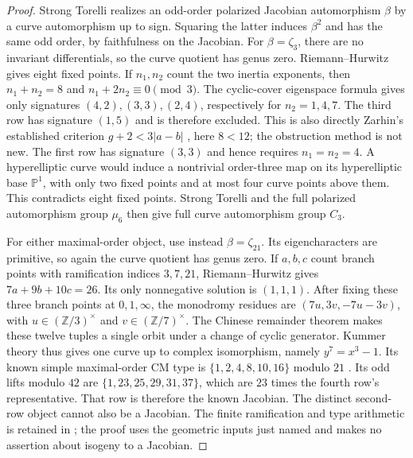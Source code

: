 \begin{proof}
Strong Torelli \cite[Theorem~12.1]{MilneJacobians2021} realizes an
odd-order polarized Jacobian automorphism $\beta$ by a curve
automorphism up to sign. Squaring the latter induces $\beta^2$
and has the same odd order, by faithfulness on the Jacobian.
For $\beta=\zeta_3$, there are no invariant differentials, so the
curve quotient has genus zero. Riemann--Hurwitz gives eight fixed
points. If $n_1,n_2$ count the two inertia exponents, then
$n_1+n_2=8$ and $n_1+2n_2\equiv0\pmod3$.
The cyclic-cover eigenspace formula
\cite[equation~(2.2)]{LiMantovanPries2021} gives only signatures
$(4,2),(3,3),(2,4)$, respectively for $n_2=1,4,7$.
The third row has signature $(1,5)$ and is therefore excluded.
This is also directly Zarhin's established criterion
$g+2<3|a-b|$ \cite[Theorem~1.1]{Zarhin2007}, here $8<12$;
the obstruction method is not new.
The first row has signature $(3,3)$ and hence requires $n_1=n_2=4$.
A hyperelliptic curve would induce a nontrivial order-three map on
its hyperelliptic base $\mathbb P^1$, with only two fixed points
and at most four curve points above them. This contradicts eight
fixed points. Strong Torelli and the full polarized automorphism
group $\mu_6$ then give full curve automorphism group $C_3$.

For either maximal-order object, use instead $\beta=\zeta_{21}$.
Its eigencharacters are primitive, so again the curve quotient
has genus zero. If $a,b,c$ count branch points with ramification
indices $3,7,21$, Riemann--Hurwitz gives
$7a+9b+10c=26$. Its only nonnegative solution is $(1,1,1)$.
After fixing these three branch points at $0,1,\infty$, the
monodromy residues are $(7u,3v,-7u-3v)$, with
$u\in(\mathbb Z/3)^\times$ and $v\in(\mathbb Z/7)^\times$.
The Chinese remainder theorem makes these twelve tuples a single
orbit under a change of cyclic generator. Kummer theory thus gives
one curve up to complex isomorphism, namely $y^7=x^3-1$.
Its known simple maximal-order CM type is
$\{1,2,4,8,10,16\}$ modulo $21$
\cite[Proposition~6.11, Lemma~6.12 and Proposition~6.14]{LiMantovanPries2021}.
Its odd lifts modulo $42$ are $\{1,23,25,29,31,37\}$, which are
$23$ times the fourth row's representative. That row is therefore
the known Jacobian. The distinct second-row object cannot also be
a Jacobian. The finite ramification and type arithmetic is retained
in ;
the proof uses the geometric inputs just named and makes no
assertion about isogeny to a Jacobian.
\end{proof}

